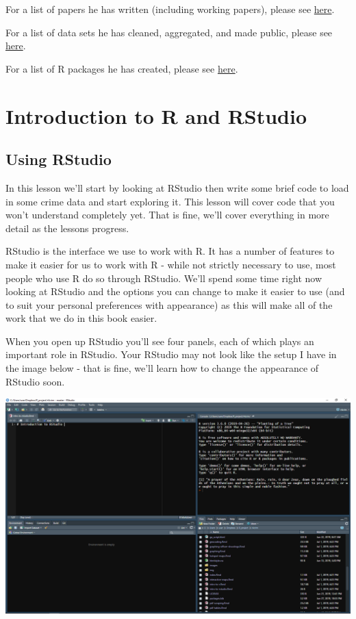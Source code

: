\documentclass[
  12pt,
  openany]{book}
\begin{document}
For a list of papers he has written (including working papers), please see \href{http://jacobdkaplan.com/research.html}{here}.

For a list of data sets he has cleaned, aggregated, and made public, please see \href{http://jacobdkaplan.com/data.html}{here}.

For a list of R packages he has created, please see \href{https://jacobdkaplan.com/packages.html}{here}.

\hypertarget{introduction-to-r-and-rstudio}{%
\chapter{Introduction to R and RStudio}\label{introduction-to-r-and-rstudio}}

\hypertarget{using-rstudio}{%
\section{Using RStudio}\label{using-rstudio}}

In this lesson we'll start by looking at RStudio then write some brief code to load in some crime data and start exploring it. This lesson will cover code that you won't understand completely yet. That is fine, we'll cover everything in more detail as the lessons progress.

RStudio is the interface we use to work with R. It has a number of features to make it easier for us to work with R - while not strictly necessary to use, most people who use R do so through RStudio. We'll spend some time right now looking at RStudio and the options you can change to make it easier to use (and to suit your personal preferences with appearance) as this will make all of the work that we do in this book easier.

When you open up RStudio you'll see four panels, each of which plays an important role in RStudio. Your RStudio may not look like the setup I have in the image below - that is fine, we'll learn how to change the appearance of RStudio soon.

\includegraphics{images/rstudio_1.PNG}
\end{document}
